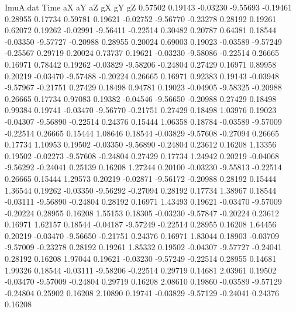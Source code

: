 \begin{filecontents}{ImuA.dat}
Time aX aY aZ gX gY gZ
   0.57502    0.19143   -0.03230   -9.55693   -0.19461    0.28955    0.17734
   0.59781    0.19621   -0.02752   -9.56770   -0.23278    0.28192    0.19261
   0.62072    0.19262   -0.02991   -9.56411   -0.22514    0.30482    0.20787
   0.64381    0.18544   -0.03350   -9.57727   -0.20988    0.28955    0.20024
   0.69003    0.19023   -0.03589   -9.57249   -0.25567    0.29719    0.20024
   0.73737    0.19621   -0.03230   -9.58086   -0.22514    0.26665    0.16971
   0.78442    0.19262   -0.03829   -9.58206   -0.24804    0.27429    0.16971
   0.89958    0.20219   -0.03470   -9.57488   -0.20224    0.26665    0.16971
   0.92383    0.19143   -0.03948   -9.57967   -0.21751    0.27429    0.18498
   0.94781    0.19023   -0.04905   -9.58325   -0.20988    0.26665    0.17734
   0.97083    0.19382   -0.04546   -9.56650   -0.20988    0.27429    0.18498
   0.99384    0.19741   -0.03470   -9.56770   -0.21751    0.27429    0.18498
   1.03976    0.19023   -0.04307   -9.56890   -0.22514    0.24376    0.15444
   1.06358    0.18784   -0.03589   -9.57009   -0.22514    0.26665    0.15444
   1.08646    0.18544   -0.03829   -9.57608   -0.27094    0.26665    0.17734
   1.10953    0.19502   -0.03350   -9.56890   -0.24804    0.23612    0.16208
   1.13356    0.19502   -0.02273   -9.57608   -0.24804    0.27429    0.17734
   1.24942    0.20219   -0.04068   -9.56292   -0.24041    0.25139    0.16208
   1.27244    0.20100   -0.03230   -9.55813   -0.22514    0.26665    0.15444
   1.29573    0.20219   -0.02871   -9.56172   -0.20988    0.28192    0.15444
   1.36544    0.19262   -0.03350   -9.56292   -0.27094    0.28192    0.17734
   1.38967    0.18544   -0.03111   -9.56890   -0.24804    0.28192    0.16971
   1.43493    0.19621   -0.03470   -9.57009   -0.20224    0.28955    0.16208
   1.55153    0.18305   -0.03230   -9.57847   -0.20224    0.23612    0.16971
   1.62157    0.18544   -0.04187   -9.57249   -0.22514    0.28955    0.16208
   1.64456    0.20219   -0.03470   -9.56650   -0.21751    0.24376    0.16971
   1.83044    0.18903   -0.03709   -9.57009   -0.23278    0.28192    0.19261
   1.85332    0.19502   -0.04307   -9.57727   -0.24041    0.28192    0.16208
   1.97044    0.19621   -0.03230   -9.57249   -0.22514    0.28955    0.14681
   1.99326    0.18544   -0.03111   -9.58206   -0.22514    0.29719    0.14681
   2.03961    0.19502   -0.03470   -9.57009   -0.24804    0.29719    0.16208
   2.08610    0.19860   -0.03589   -9.57129   -0.24804    0.25902    0.16208
   2.10890    0.19741   -0.03829   -9.57129   -0.24041    0.24376    0.16208

\end{filecontents}
